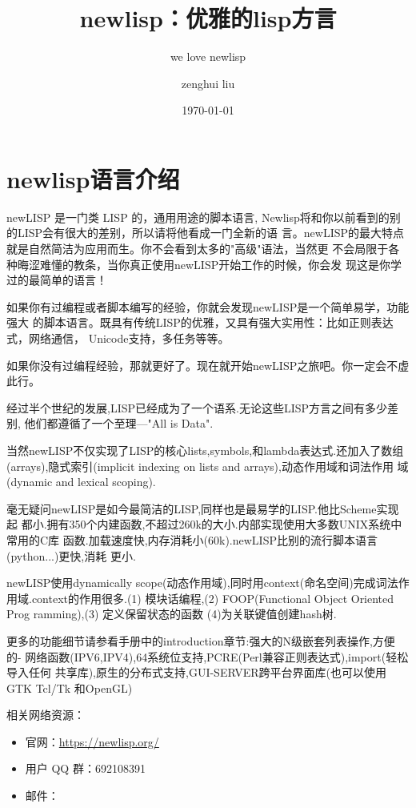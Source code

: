 \documentclass[cn,11pt]{elegantbook}
\title{newlisp：优雅的lisp方言}
\subtitle{we love newlisp}
\author{zenghui liu}
\institute{newlisp\funs}
\date{\today}
\begin{document}
\maketitle
\tableofcontents


\mainmatter
\hypersetup{pageanchor=true}

\chapter{newlisp语言介绍}
newLISP 是一门类 LISP 的，通用用途的脚本语言,
Newlisp将和你以前看到的别的LISP会有很大的差别，所以请将他看成一门全新的语
言。newLISP的最大特点就是自然简洁为应用而生。你不会看到太多的"高级"语法，当然更
不会局限于各种晦涩难懂的教条，当你真正使用newLISP开始工作的时候，你会发
现这是你学过的最简单的语言！

如果你有过编程或者脚本编写的经验，你就会发现newLISP是一个简单易学，功能强大
的脚本语言。既具有传统LISP的优雅，又具有强大实用性：比如正则表达式，网络通信，
Unicode支持，多任务等等。

如果你没有过编程经验，那就更好了。现在就开始newLISP之旅吧。你一定会不虚此行。

经过半个世纪的发展,LISP已经成为了一个语系.无论这些LISP方言之间有多少差别,
他们都遵循了一个至理---"All is Data".

当然newLISP不仅实现了LISP的核心lists,symbols,和lambda表达式.还加入了数组
(arrays),隐式索引(implicit indexing on lists and arrays),动态作用域和词法作用
域(dynamic  and lexical scoping).

毫无疑问newLISP是如今最简洁的LISP,同样也是最易学的LISP.他比Scheme实现起  都小.拥有350个内建函数,不超过260k的大小.内部实现使用大多数UNIX系统中常用的C库
函数.加载速度快,内存消耗小(60k).newLISP比别的流行脚本语言(python...)更快,消耗
更小.

newLISP使用dynamically scope(动态作用域),同时用context(命名空间)完成词法作
用域.context的作用很多.(1) 模块话编程,(2) FOOP(Functional Object Oriented Prog
ramming),(3) 定义保留状态的函数 (4)为关联键值创建hash树.

更多的功能细节请参看手册中的introduction章节:强大的N级嵌套列表操作,方便的- 网络函数(IPV6,IPV4),64系统位支持,PCRE(Perl兼容正则表达式),import(轻松导入任何
共享库),原生的分布式支持,GUI-SERVER跨平台界面库(也可以使用GTK Tcl/Tk 和OpenGL)
 

相关网络资源：
\begin{itemize}
\item 官网：\href{https://newlisp.org/}{https://newlisp.org/}
\item 用户 QQ 群：692108391 
\item 邮件：
\end{itemize}
\end{document}
